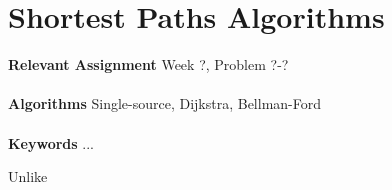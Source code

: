 
\chapter{Shortest Paths Algorithms}
\label{ch:shortestpathsalgorithms}

\textbf{Relevant Assignment} Week ?, Problem ?-?\\\\
\textbf{Algorithms} Single-source, Dijkstra, Bellman-Ford\\\\
\textbf{Keywords} ...
\vspace{1in}

\noindent Unlike 

